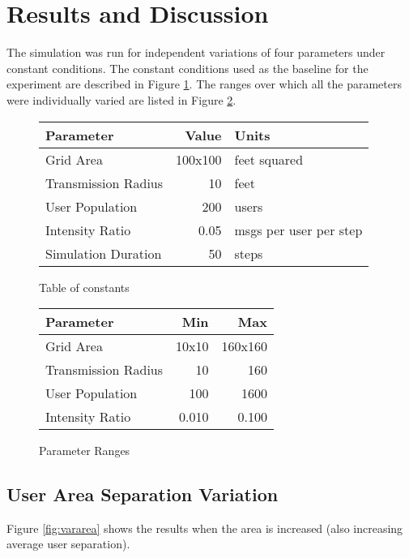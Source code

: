 \section{Results and Discussion}
The simulation was run for independent variations of four parameters under constant conditions.
The constant conditions used as the baseline for the experiment are described in 
Figure \ref{fig:consttable}.
The ranges over which all the parameters were individually varied are listed in 
Figure \ref{fig:rangetable}.

\begin{figure}[!htb]
    \centering
    \begin{tabular}{l|rl}
        \hline
        Parameter               & Value     & Units                     \\
        \hline
        Grid Area               & 100x100   & feet squared              \\
        Transmission Radius     & 10        & feet                      \\
        User Population         & 200       & users                     \\
        \hline
        Intensity Ratio         & 0.05      & msgs per user per step    \\
        Simulation Duration     & 50        & steps                     \\
        \hline
    \end{tabular}
    \caption{Table of constants}
    \label{fig:consttable}
\end{figure}

\begin{figure}[!htb]
    \centering
    \begin{tabular}{l|rr}
        \hline
        Parameter               & Min   & Max       \\
        \hline
        Grid Area               & 10x10 & 160x160   \\
        Transmission Radius     & 10    & 160       \\
        User Population         & 100   & 1600      \\
        \hline
        Intensity Ratio         & 0.010 & 0.100     \\
        \hline
    \end{tabular}
    \caption{Parameter Ranges}
    \label{fig:rangetable}
\end{figure}

\subsection{User Area Separation Variation}
Figure \ref{fig:vararea} shows the results when the area is increased
(also increasing average user separation).


